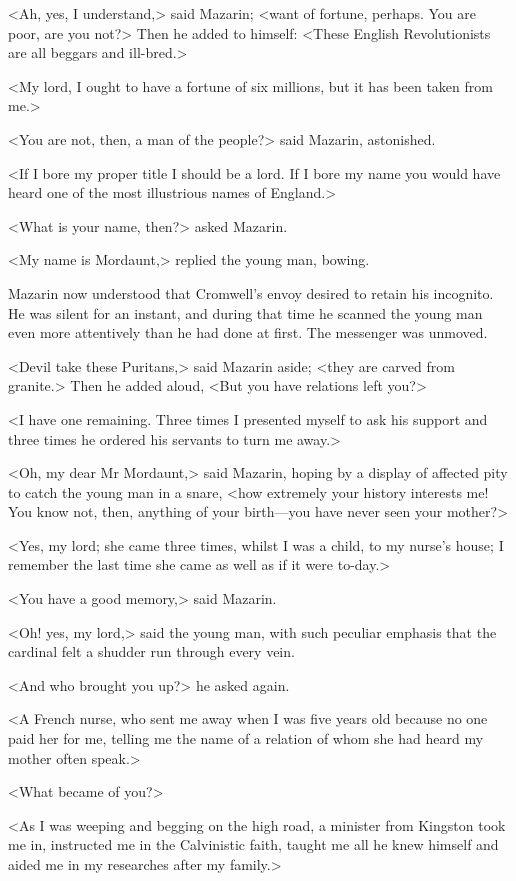 <Ah, yes, I understand,> said Mazarin; <want of fortune, perhaps. You are poor, are you not?> Then he added to himself: <These English Revolutionists are all beggars and ill-bred.>

<My lord, I ought to have a fortune of six millions, but it has been taken from me.>

<You are not, then, a man of the people?> said Mazarin, astonished.

<If I bore my proper title I should be a lord. If I bore my name you would have heard one of the most illustrious names of England.>

<What is your name, then?> asked Mazarin.

<My name is Mordaunt,> replied the young man, bowing.

Mazarin now understood that Cromwell's envoy desired to retain his incognito. He was silent for an instant, and during that time he scanned the young man even more attentively than he had done at first. The messenger was unmoved.

<Devil take these Puritans,> said Mazarin aside; <they are carved from granite.> Then he added aloud, <But you have relations left you?>

<I have one remaining. Three times I presented myself to ask his support and three times he ordered his servants to turn me away.>

<Oh,  my dear Mr Mordaunt,> said Mazarin, hoping by a display of affected pity to catch the young man in a snare, <how extremely your history interests me! You know not, then, anything of your birth—you have never seen your mother?>

<Yes, my lord; she came three times, whilst I was a child, to my nurse's house; I remember the last time she came as well as if it were to-day.>

<You have a good memory,> said Mazarin.

<Oh! yes, my lord,> said the young man, with such peculiar emphasis that the cardinal felt a shudder run through every vein.

<And who brought you up?> he asked again.

<A French nurse, who sent me away when I was five years old because no one paid her for me, telling me the name of a relation of whom she had heard my mother often speak.>

<What became of you?>

<As I was weeping and begging on the high road, a minister from Kingston took me in, instructed me in the Calvinistic faith, taught me all he knew himself and aided me in my researches after my family.>

